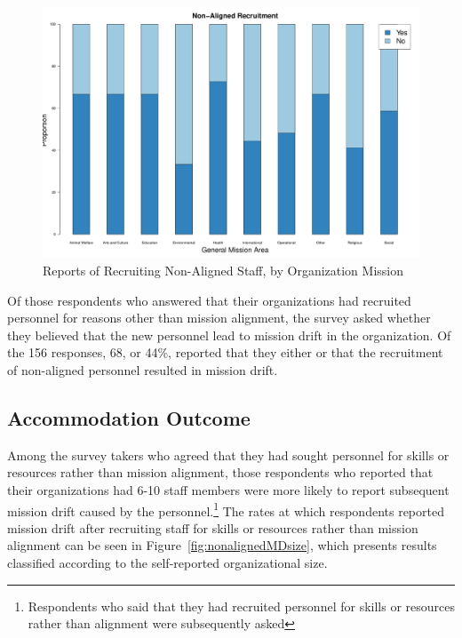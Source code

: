 \begin{figure}[t]
\includegraphics[width=.99\columnwidth]{./Pictures/NonAlignedRecruitmentByMission.pdf}
\centering
\caption{Reports of Recruiting Non-Aligned Staff, by Organization Mission}
\label{fig:nonalignedmission}
\end{figure}

Of those respondents who answered that their organizations had recruited personnel for reasons other than mission alignment, the survey asked whether they believed that the new personnel lead to mission drift in the organization. Of the 156 responses, 68, or 44\%, reported that they either  or  that the recruitment of non-aligned personnel resulted in mission drift. 
\subsection{Accommodation Outcome}

Among the survey takers who agreed that they had sought personnel for skills or resources rather than mission alignment, those respondents who reported that their organizations had 6-10 staff members were more likely to report subsequent mission drift caused by the personnel.\footnote{Respondents who said that they had recruited personnel for skills or resources rather than alignment were subsequently asked } The rates at which respondents reported mission drift after recruiting staff for skills or resources rather than mission alignment can be seen in Figure~\ref{fig:nonalignedMDsize}, which presents results classified according to the self-reported organizational size.

